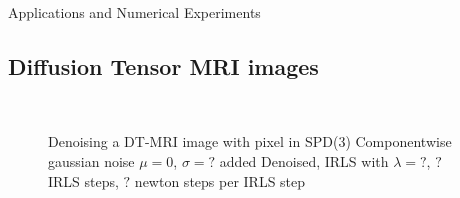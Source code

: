 \begin{chapter}{Applications and Numerical Experiments}

\FloatBarrier
\subsection{Diffusion Tensor MRI images} %
\label{sub:Diffusion Tensor MRI images}
\begin{figure}[h!]
    \centering
    \\
    \caption[Denoising DT-MRI data]{Denoising a DT-MRI image with pixel in SPD(3)
	 Componentwise gaussian noise $\mu=0$, $\sigma=?$ added
	 Denoised, IRLS with $\lambda=?$, $?$ IRLS steps, $?$ newton steps per IRLS step
	\label{fig:application_dti1}
    }
\end{figure}



\FloatBarrier

\end{chapter}
